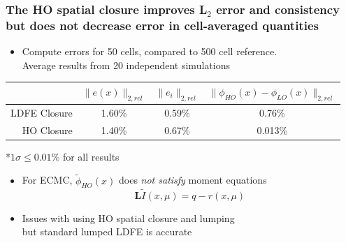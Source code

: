 \documentclass[xcolor=dvipsnames,hyperref={pdfpagelabels=false},unknownkeysallowed]{beamer}
\newcommand{\colG}[1]{{\color{Gray!110} #1}}
\newlength{\wideitemsep}
\let\olditem\item
\renewcommand{\item}{\setlength{\itemsep}{\wideitemsep}\olditem}
\newcommand{\B}[1]{\ensuremath{\mathbf{#1}}}
\begin{document}
\begin{frame}
    \frametitle{The HO spatial closure improves L$_2$ error and consistency but does not
    decrease error in cell-averaged quantities}
    {\addtolength{\leftmargini}{-1.0cm}
        \fontsize{11.2}{12.0}\selectfont
    \begin{itemize}
\item Compute errors for 50 cells, compared to 500 cell reference. \\ \colG{Average results from 20 independent simulations}
    \end{itemize}
        \begin{table}
            \begin{center}
                \begin{tabular}{r|ccc} \cline{2-4}
          & \multicolumn{1}{|c}{$\|e(x)\|_{2,rel}$}  &
        \multicolumn{1}{c}{$\|e_i\|_{2,rel}$} & \multicolumn{1}{c}{$\|\phi_{HO}(x)
    -\phi_{LO}(x)\|_{2,rel}$} \\  \hline 
LDFE   Closure            &   1.60\%   &   0.59\%   &   0.76\%   \\
HO Closure        &   1.40\%  &   0.67\%     &   0.013\%  \\ \hline
    \end{tabular}
\end{center}
\colG{*$1\sigma \leq 0.01 \%$ for all results}
        \end{table}
    \begin{itemize}
            \pause
        \item For ECMC, $\tilde \phi_{HO}(x)$ does \emph{not satisfy} moment equations
            \vspace{-0.1in}
            \begin{equation*}
               \B  L \tilde I(x,\mu) = q - r(x,\mu)
            \end{equation*}
        \item Issues with using HO spatial closure and lumping \\ \colG{but standard lumped LDFE is accurate}
    \end{itemize}
}
\end{frame}
\end{document}
